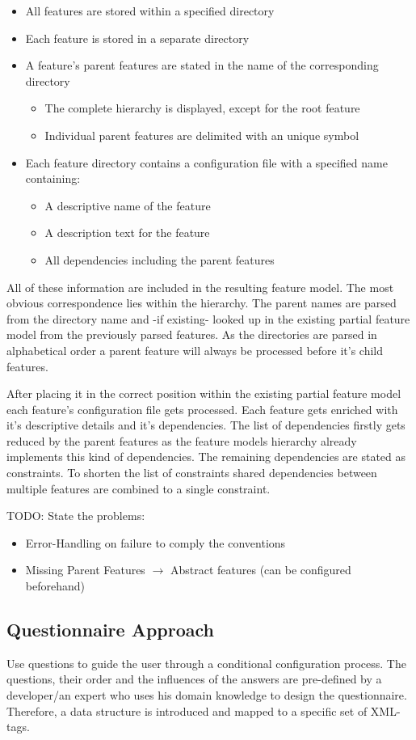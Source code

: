 \begin{itemize}
	\item All features are stored within a specified directory
	\item Each feature is stored in a separate directory
	\item A feature's parent features are stated in the name of the corresponding directory
	\begin{itemize}
		\item The complete hierarchy is displayed, except for the root feature
		\item Individual parent features are delimited with an unique symbol
	\end{itemize}
	\item Each feature directory contains a configuration file with a specified name containing:
	\begin{itemize}
		\item A descriptive name of the feature
		\item A description text for the feature
		\item All dependencies including the parent features
	\end{itemize}
\end{itemize}

All of these information are included in the resulting feature model. The most obvious correspondence lies within the hierarchy. The parent names are parsed from the directory name and -if existing- looked up in the existing partial feature model from the previously parsed features. As the directories are parsed in alphabetical order a parent feature will always be processed before it's child features.

After placing it in the correct position within the existing partial feature model each feature's configuration file gets processed. Each feature gets enriched with it's descriptive details and it's dependencies. The list of dependencies firstly gets reduced by the parent features as the feature models hierarchy already implements this kind of dependencies. The remaining dependencies are stated as constraints. To shorten the list of constraints shared dependencies between multiple features are combined to a single constraint.\\

{\color{red}TODO: State the problems:
\begin{itemize}
\item Error-Handling on failure to comply the conventions
\item Missing Parent Features $\rightarrow$ Abstract features (can be configured beforehand)
\end{itemize}}

\subsection{Questionnaire Approach}
Use questions to guide the user through a conditional configuration process. The questions, their order and the influences of the answers are pre-defined by a developer/an expert who uses his domain knowledge to design the questionnaire. Therefore, a data structure is introduced and mapped to a specific set of XML-tags.